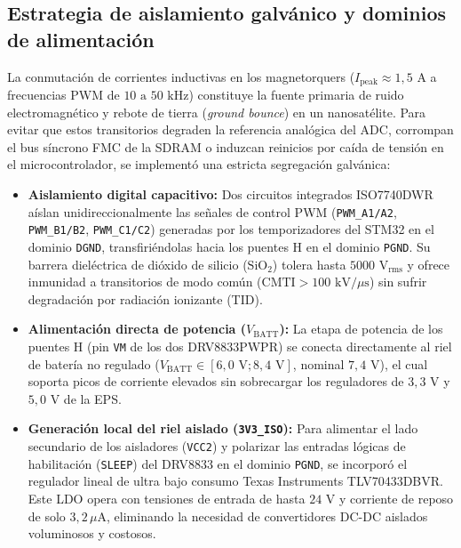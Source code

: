 \documentclass[11pt,a4paper]{article}
\begin{document}
\subsection{Estrategia de aislamiento galvánico y dominios de alimentación}
La conmutación de corrientes inductivas en los magnetorquers ($I_{\text{peak}} \approx 1{,}5\text{ A}$ a frecuencias PWM de $10\text{ a }50\text{ kHz}$) constituye la fuente primaria de ruido electromagnético y rebote de tierra (\emph{ground bounce}) en un nanosatélite. Para evitar que estos transitorios degraden la referencia analógica del ADC, corrompan el bus síncrono FMC de la SDRAM o induzcan reinicios por caída de tensión en el microcontrolador, se implementó una estricta segregación galvánica:
\begin{itemize}
    \item \textbf{Aislamiento digital capacitivo:} Dos circuitos integrados ISO7740DWR aíslan unidireccionalmente las señales de control PWM (\texttt{PWM\_A1/A2}, \texttt{PWM\_B1/B2}, \texttt{PWM\_C1/C2}) generadas por los temporizadores del STM32 en el dominio \texttt{DGND}, transfiriéndolas hacia los puentes H en el dominio \texttt{PGND}. Su barrera dieléctrica de dióxido de silicio ($\text{SiO}_2$) tolera hasta $5000\text{ V}_{\text{rms}}$ y ofrece inmunidad a transitorios de modo común ($\text{CMTI} > 100\text{ kV}/\mu\text{s}$) sin sufrir degradación por radiación ionizante (TID).
    \item \textbf{Alimentación directa de potencia ($V_{\text{BATT}}$):} La etapa de potencia de los puentes H (pin \texttt{VM} de los dos DRV8833PWPR) se conecta directamente al riel de batería no regulado ($V_{\text{BATT}} \in [6{,}0\text{ V}; 8{,}4\text{ V}]$, nominal $7{,}4\text{ V}$), el cual soporta picos de corriente elevados sin sobrecargar los reguladores de $3{,}3\text{ V}$ y $5{,}0\text{ V}$ de la EPS.
    \item \textbf{Generación local del riel aislado (\texttt{3V3\_ISO}):} Para alimentar el lado secundario de los aisladores (\texttt{VCC2}) y polarizar las entradas lógicas de habilitación (\texttt{SLEEP}) del DRV8833 en el dominio \texttt{PGND}, se incorporó el regulador lineal de ultra bajo consumo Texas Instruments TLV70433DBVR. Este LDO opera con tensiones de entrada de hasta $24\text{ V}$ y corriente de reposo de solo $3{,}2\,\mu\text{A}$, eliminando la necesidad de convertidores DC-DC aislados voluminosos y costosos.
\end{itemize}

\end{document}
